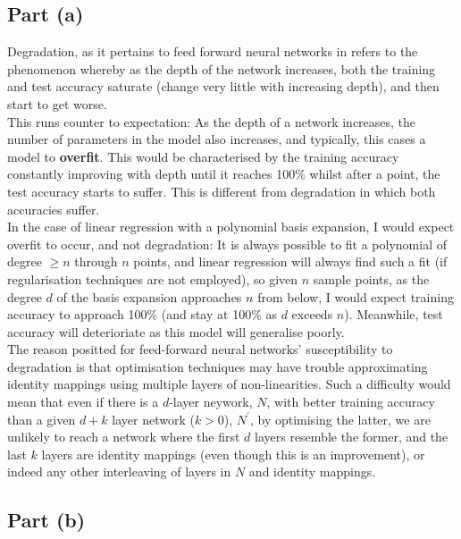 \subsection{Part (a)}

Degradation\cite{DBLP:journals/corr/HeZRS15}, as it pertains to feed forward neural networks in refers to the phenomenon whereby as the depth of the network increases, both the training and test accuracy saturate (change very little with increasing depth), and then start to get worse.\\[1em]

This runs counter to expectation: As the depth of a network increases, the number of parameters in the model also increases, and typically, this cases a model to \textbf{overfit}. This would be characterised by the training accuracy constantly improving with depth until it reaches 100\% whilst after a point, the test accuracy starts to suffer. This is different from degradation in which both accuracies suffer.\\[1em]

In the case of linear regression with a polynomial basis expansion, I would expect overfit to occur, and not degradation: It is always possible to fit a polynomial of degree $\geq n$ through $n$ points, and linear regression will always find such a fit (if regularisation techniques are not employed), so given $n$ sample points, as the degree $d$ of the basis expansion approaches $n$ from below, I would expect training accuracy to approach 100\% (and stay at 100\% as $d$ exceeds $n$). Meanwhile, test accuracy will deterioriate as this model will generalise poorly.\\[1em]

The reason positted for feed-forward neural networks' susceptibility to degradation is that optimisation techniques may have trouble approximating identity mappings using multiple layers of non-linearities. Such a difficulty would mean that even if there is a $d$-layer neywork, $N$, with better training accuracy than a given $d+k$ layer network ($k > 0$), $N^\prime$, by optimising the latter, we are unlikely to reach a network where the first $d$ layers resemble the former, and the last $k$ layers are identity mappings (even though this is an improvement), or indeed any other interleaving of layers in $N$ and identity mappings.

\subsection{Part (b)}

